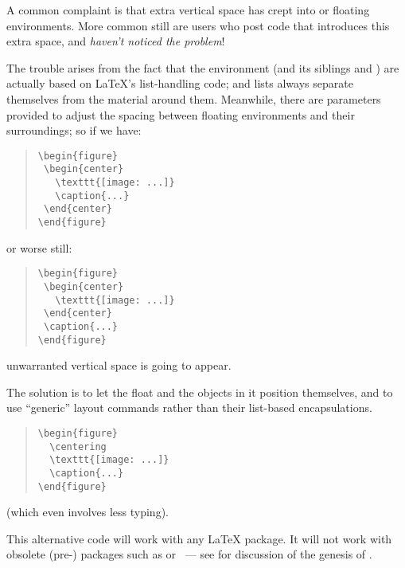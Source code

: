 

A common complaint is that extra vertical space has crept into
 or  floating environments.
More common still are users who post code that introduces this extra
space, and \emph{haven't noticed the problem}!

The trouble arises from the fact that the 
environment (and its siblings  and
) are actually based on \LaTeX{}'s
list-handling code; and lists always separate themselves from the
material around them.  Meanwhile, there are parameters provided to
adjust the spacing between floating environments and their
surroundings; so if we have:
\begin{quote}
\begin{verbatim}
\begin{figure}
 \begin{center}
   \texttt{[image: ...]}
   \caption{...}
 \end{center}
\end{figure}
\end{verbatim}
\end{quote}
\nothtml{\noindent}or worse still:
\begin{quote}
\begin{verbatim}
\begin{figure}
 \begin{center}
   \texttt{[image: ...]}
 \end{center}
 \caption{...}
\end{figure}
\end{verbatim}
\end{quote}
unwarranted vertical space is going to appear.

The solution is to let the float and the objects in it position
themselves, and to use ``generic'' layout commands rather than their
list-based encapsulations.
\begin{quote}
\begin{verbatim}
\begin{figure}
  \centering
  \texttt{[image: ...]}
  \caption{...}
\end{figure}
\end{verbatim}
\end{quote}
(which even involves less typing).

This alternative code will work with any \LaTeX{} package.  It will
not work with obsolete (pre-\LaTeXe{}) packages such as
 or ~--- see %
 for discussion of the
genesis of .

